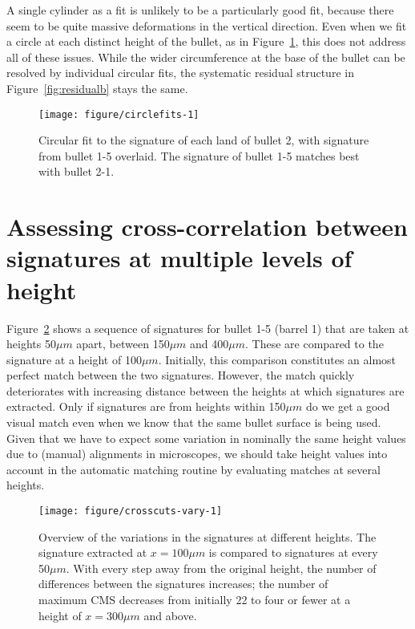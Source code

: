 \documentclass[aoas]{imsart}\usepackage[]{graphicx}\usepackage[]{color}
\newenvironment{knitrout}{}{} %
\begin{document}
A single cylinder as a fit is unlikely to be a particularly good fit, because there seem to be quite massive deformations in the vertical direction. Even when we fit a circle at each distinct height of the bullet, as in Figure~\ref{fig:circlefits}, this does not address all of these issues. While the wider circumference at the base of the bullet can be resolved by individual circular fits, the systematic residual structure in Figure~\ref{fig:residualb} stays the same.





\begin{figure}[hbtp]
  \centering
\begin{knitrout}
\color{fgcolor}
\texttt{[image: figure/circlefits-1]} 

\end{knitrout}
\caption{Circular fit to the signature of each land of bullet 2, with signature from bullet 1-5 overlaid.\label{fig:circlefits} The signature of bullet 1-5 matches best with bullet 2-1.}
\end{figure}

\newpage
\section{Assessing cross-correlation between signatures at multiple levels of height}\label{supp:ccf}

Figure~\ref{fig:crosscuts} shows a sequence of signatures for bullet 1-5 (barrel 1) that are taken at heights 50$\mu m$ apart, between 150$\mu m$  and 400$\mu m$. These are compared to the signature at a height of 100$\mu m$. Initially, this comparison constitutes an almost perfect match between the two signatures. However, the match quickly deteriorates with increasing distance between the heights at which signatures are extracted.  Only if signatures are from heights  within 150$\mu m$ do we get a good visual match even when we know that the same bullet surface is being used. 
Given that we have to expect some variation in nominally the same height values due to (manual) alignments in microscopes, we should take height values into account in the automatic matching routine by evaluating matches at several heights. 
\begin{figure}[hbtp]
  \centering
\begin{knitrout}
\color{fgcolor}
\texttt{[image: figure/crosscuts-vary-1]} 

\end{knitrout}
\caption{\label{fig:crosscuts}Overview of the variations in the signatures at different heights. The signature extracted at $x = 100\mu m$ is compared to signatures at every 50$\mu m$. With every step away from the original height, the number of differences between the signatures increases; the number of maximum CMS decreases from initially 22 to  four or fewer at a height of $x = 300\mu m$ and above. }
\end{figure}
\end{document}

